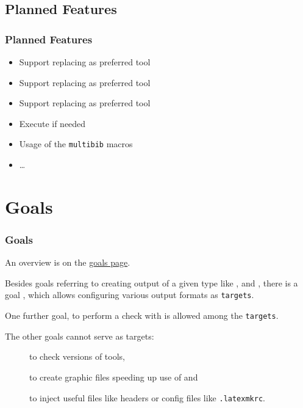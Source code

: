 \subsection{Planned Features}

\begin{frame}
  \frametitle{Planned Features}
  \begin{itemize}
  \item Support  replacing  as preferred tool
  \item Support  replacing  as preferred tool
  \item Support  replacing  as preferred tool
  \item Execute  if needed
  \item Usage of the \texttt{multibib} macros
  \item \dots
  \end{itemize}
\end{frame}


\section{Goals}

\begin{frame}
  \frametitle{Goals}

  An overview is on the 
  \href{http://simuline.eu/LatexMavenPlugin/plugin-info.html}{goals page}. 
  
  Besides goals referring to creating output of a given type 
  like \alert{}, \alert{} and \alert{}, 
  there is a goal \alert{}, 
  which allows 
  \alert con\alert fi\alert guring various output formats as \texttt{targets}. %
  
  One further goal, \alert{} to perform a check with  
  is allowed among the \texttt{targets}. 

  The other goals cannot serve as targets: 
  \begin{description}
    \item[] to check versions of tools, 
    \item[] to create graphic files speeding up use of  
    and 
    \item[] to inject useful files like headers or config files 
    like \texttt{.latexmkrc}. 
  \end{description}
\end{frame}

